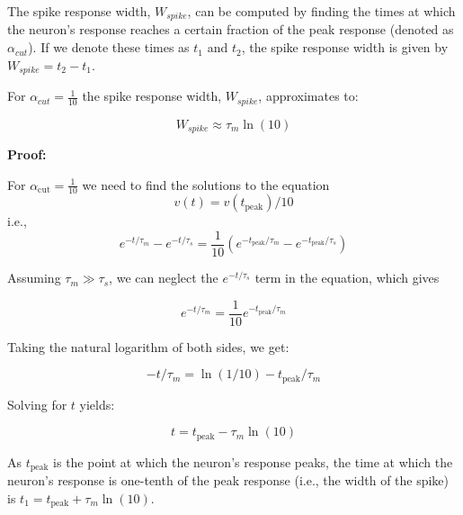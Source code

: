 The spike response width, $W_{spike}$, can be computed by finding the times at which the neuron's response reaches a certain fraction of the peak response (denoted as $\alpha_{cut}$). If we denote these times as $t_1$ and $t_2$, the spike response width is given by $W_{spike} = t_2 - t_1$.

\begin{mdframed}[backgroundcolor=red_background, linecolor=black, linewidth=2pt, frametitle=\textbf{Statement}]
\begin{center}

    \label{st:window-width}
    For $\alpha_{cut} = \frac{1}{10}$ the spike response width, $W_{spike}$, approximates to:

    \begin{equation}
        W_{spike} \approx \tau_m \ln(10)
    \end{equation}

\end{center}
\end{mdframed}


\textbf{Proof:}

For $\alpha_{\text{{cut}}} = \frac{1}{10}$ we need to find the solutions to the equation
\begin{equation}
    v(t) = v(t_{\text{{peak}}})/10
\end{equation}
i.e.,
\begin{equation}
e^{-t/\tau_m} - e^{-t/\tau_s} = \frac{1}{10}\left(e^{-t_{\text{{peak}}}/\tau_m} - e^{-t_{\text{{peak}}}/\tau_s}\right)
\end{equation}

Assuming $\tau_m \gg \tau_s$, we can neglect the $e^{-t/\tau_s}$ term in the equation, which gives

\begin{equation}
e^{-t/\tau_m} = \frac{1}{10} e^{-t_{\text{{peak}}}/\tau_m}
\end{equation}

Taking the natural logarithm of both sides, we get:

\begin{equation}
-t/\tau_m = \ln(1/10) - t_{\text{{peak}}}/\tau_m
\end{equation}

Solving for $t$ yields:

\begin{equation}
t = t_{\text{{peak}}} - \tau_m \ln(10)
\end{equation}

As $t_{\text{{peak}}}$ is the point at which the neuron's response peaks, the time at which the neuron's response is one-tenth of the peak response (i.e., the width of the spike) is $t_1 = t_{\text{{peak}}} + \tau_m \ln(10)$.


